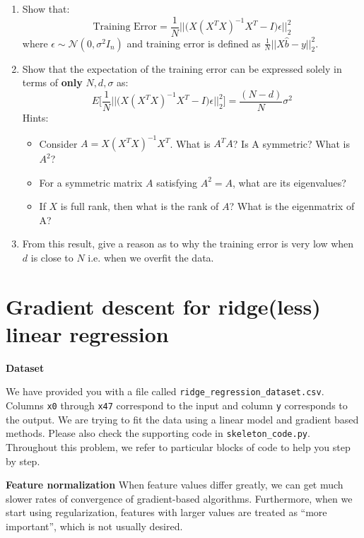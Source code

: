 \documentclass{article}
\newcommand{\nyuparagrah}[1]{\textcolor{nyupurple}{\large #1}}
\begin{document}
\begin{enumerate}
  
  \item Show that: 
    $$
    \textrm{Training Error} = \frac{1}{N} \Big|\Big| \Big( X(X^TX)^{-1}X^T - I \Big) \epsilon \Big| \Big|^2_2
    $$
    where $\epsilon \sim \mathcal{N}(0, \sigma^2 I_n)$ and training error is defined as $\frac{1}{N}||X\hat{b} - y||_2^2$. 

  \item Show that the expectation of the training error can be expressed solely in terms of \textbf{only} $N, d, \sigma$ as:
  $$
  E \Big[ \frac{1}{N} \Big|\Big| \Big( X(X^TX)^{-1}X^T - I \Big) \epsilon \Big| \Big|^2_2 \Big] = \frac{(N-d)}{N}\sigma^2
  $$ 
  Hints:
  \begin{itemize}
    \item Consider $A = X(X^TX)^{-1}X^T$. What is $A^TA$? Is A symmetric? What is $A^2$?
    \item For a symmetric matrix $A$ satisfying $A^2 = A$, what are its eigenvalues? 
    \item If $X$ is full rank, then what is the rank of $A$? What is the eigenmatrix of A?
  \end{itemize}
  
  \item From this result, give a reason as to why the training error is very low when $d$ is close to $N$ i.e. when we overfit the data. 
   
\setcounter{saveenum}{\value{enumi}}
\end{enumerate}

\section{\large Gradient descent for ridge(less) linear regression}

\nyuparagrah{\bf Dataset} 

We have provided you with a file called \texttt{ridge\_regression\_dataset.csv}. Columns \texttt{x0} through \texttt{x47} correspond to the input and column \texttt{y} corresponds to the output. We are trying to fit the data using a linear model and gradient based methods. Please also check the supporting code in \texttt{skeleton\_code.py}. Throughout this problem, we refer to particular blocks of code to help you step by step. 


\nyuparagrah{\bf Feature normalization}
When feature values differ greatly, we can get much slower rates of
convergence of gradient-based algorithms. Furthermore, when we start
using regularization, features with
larger values are treated as ``more important'', which is not usually
desired.  
\end{document}
